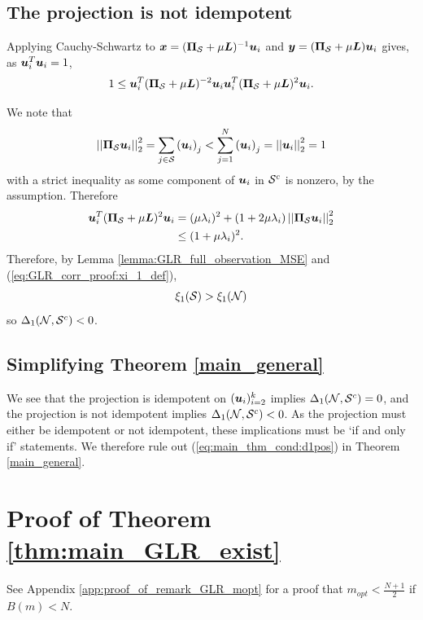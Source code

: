 \subsection{The projection is not idempotent}
Applying Cauchy-Schwartz to $\vect{x} = (\proj{S} + \mu \matr{L})^{-1}\vect{u}_{i}$ and  $\vect{y} = (\proj{S} + \mu \matr{L})\vect{u}_{i}$ gives, as $\bm{u}_{i}^{T}\bm{u}_{i} = 1$,
\begin{align}
    1 \leq \vect{u}_{i}^{T}(\proj{S} + \mu \matr{L})^{-2}\vect{u}_{i} \vect{u}_{i}^{T}(\proj{S} + \mu \matr{L})^{2}\vect{u}_{i}.
\end{align}

We note that 
\begin{align}
    \sqnormvec{\proj{S}\vect{u}_{i}} = \sum_{j \in \set{S}} \left(\vect{u}_{i}\right)_{j} < \sum_{j =1}^{N} \left(\vect{u}_{i}\right)_{j} = \sqnormvec{\vect{u}_{i}} = 1
\end{align}
with a strict inequality as some component of $\bm{u}_{i}$ in $\mathcal{S}^{c}$ is nonzero, by the assumption.
Therefore
\begin{align}
    \vect{u}_{i}^{T}(\proj{S} + \mu \matr{L})^{2}\vect{u}_{i} &= (\mu\lambda_{i})^{2} + (1 + 2\mu\lambda_{i}) \sqnormvec{\proj{S}\vect{u}_{i}} \\
    &\leq (1 + \mu\lambda_{i})^{2}.
\end{align}
Therefore, by Lemma \ref{lemma:GLR_full_observation_MSE} and (\ref{eq:GLR_corr_proof:xi_1_def}),
\begin{equation}
    \xi_{1}(\mathcal{S}) > \xi_{1}(\mathcal{N})
\end{equation}
so $\Delta_{1}(\mathcal{N},\mathcal{S}^{c}) < 0$.

\subsection{Simplifying Theorem \ref{main_general}}
We see that the projection is idempotent on $(\bm{u}_{i})_{i=2}^{k}$ implies $\Delta_{1}(\mathcal{N},\mathcal{S}^{c}) = 0$, and the projection is not idempotent implies $\Delta_{1}(\mathcal{N},\mathcal{S}^{c}) < 0$. As the projection must either be idempotent or not idempotent, these implications must be `if and only if' statements. We therefore rule out (\ref{eq:main_thm_cond:d1pos}) in Theorem \ref{main_general}. 

\section{Proof of Theorem \ref{thm:main_GLR_exist}}
\label{app:Proof_thm_main_GLR_exist}
\noindent See Appendix \ref{app:proof_of_remark_GLR_mopt} for a proof that $ m_{opt} < \frac{N+1}{2}$ if $B(m)<N$.

